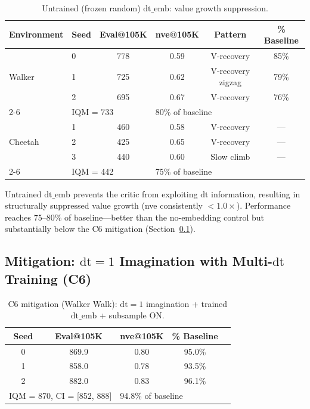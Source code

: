 \documentclass[10pt,letterpaper]{article}
\newcommand{\dt}{\mathrm{dt}}
\begin{document}
\begin{table}[h]
\centering
\caption{Untrained (frozen random) $\dt\_\text{emb}$: value growth suppression.}
\label{tab:untrained}
\begin{tabular}{llcccc}
\toprule
Environment & Seed & Eval@105K & nve@105K & Pattern & \% Baseline \\
\midrule
\multirow{3}{*}{Walker} & 0 & 778 & 0.59 & V-recovery & 85\% \\
                        & 1 & 725 & 0.62 & V-recovery zigzag & 79\% \\
                        & 2 & 695 & 0.67 & V-recovery & 76\% \\
\cmidrule{2-6}
                        & \multicolumn{2}{l}{IQM = 733} & \multicolumn{3}{l}{80\% of baseline} \\
\midrule
\multirow{3}{*}{Cheetah} & 1 & 460 & 0.58 & V-recovery & --- \\
                         & 2 & 425 & 0.65 & V-recovery & --- \\
                         & 3 & 440 & 0.60 & Slow climb & --- \\
\cmidrule{2-6}
                         & \multicolumn{2}{l}{IQM = 442} & \multicolumn{3}{l}{75\% of baseline} \\
\bottomrule
\end{tabular}
\end{table}

Untrained $\dt\_\text{emb}$ prevents the critic from exploiting $\dt$ information, resulting in structurally suppressed value growth (nve consistently $< 1.0\times$).
Performance reaches 75--80\% of baseline---better than the no-embedding control but substantially below the C6 mitigation (Section~\ref{sec:mitigation}).

\subsection{Mitigation: $\dt=1$ Imagination with Multi-$\dt$ Training (C6)}
\label{sec:mitigation}

\begin{table}[h]
\centering
\caption{C6 mitigation (Walker Walk): $\dt=1$ imagination + trained $\dt\_\text{emb}$ + subsample ON.}
\label{tab:c6_walker}
\begin{tabular}{ccccc}
\toprule
Seed & Eval@105K & nve@105K & \% Baseline \\
\midrule
0 & 869.9 & 0.80 & 95.0\% \\
1 & 858.0 & 0.78 & 93.5\% \\
2 & 882.0 & 0.83 & 96.1\% \\
\midrule
\multicolumn{2}{l}{IQM = 870, CI = [852, 888]} & \multicolumn{2}{l}{94.8\% of baseline} \\
\bottomrule
\end{tabular}
\end{table}
\end{document}

